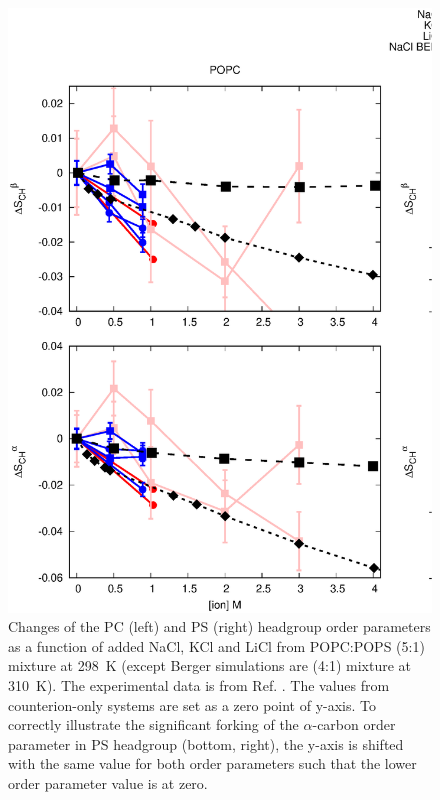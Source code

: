 \documentclass[journal=jpcbfk]{achemso}
\begin{document}
\begin{figure}[]
  \centering
  \includegraphics[width=17.0cm]{../Figs/CHANGESwithMONVALENTwithPS.eps}
  \caption{\label{PSresponseTONaCl}
    Changes of the PC (left) and PS (right) headgroup order parameters as a function of
    added NaCl, KCl and LiCl from POPC:POPS (5:1) mixture at 298~K
    (except Berger simulations are (4:1) mixture at 310~K).
    The experimental data is from Ref. .
    The values from counterion-only systems are set as a zero point of y-axis.
    To correctly illustrate the significant forking of the $\alpha$-carbon order parameter
    in PS headgroup (bottom, right), the y-axis is shifted with the same value for both order parameters such that the lower order
    parameter value is at zero.
  }
\end{figure}
\end{document}
